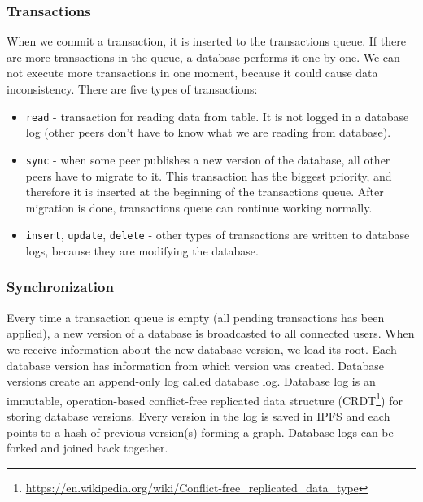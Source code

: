 \subsubsection{Transactions}
When we commit a transaction, it is inserted to the transactions queue. If there are more transactions in the queue, a database performs it one by one. We can not execute more transactions in one moment, because it could cause data inconsistency. There are five types of transactions:
\begin{itemize}
    \item \texttt{read} - transaction for reading data from table. It is not logged in a database log (other peers don't have to know what we are reading from database).
    \item \texttt{sync} - when some peer publishes a new version of the database, all other peers have to migrate to it. This transaction has the biggest priority, and therefore it is inserted at the beginning of the transactions queue. After migration is done, transactions queue can continue working normally.
    \item \texttt{insert}, \texttt{update}, \texttt{delete} - other types of transactions are written to database logs, because they are modifying the database.
\end{itemize}

\subsubsection{Synchronization} 
Every time a transaction queue is empty (all pending transactions has been applied), a new version of a database is broadcasted to all connected users. When we receive information about the new database version, we load its root. Each database version has information from which version was created. Database versions create an append-only log called database log. Database log is an immutable, operation-based conflict-free replicated data structure (CRDT\footnote{\url{https://en.wikipedia.org/wiki/Conflict-free_replicated_data_type}}) for storing database versions. Every version in the log is saved in IPFS and each points to a hash of previous version(s) forming a graph. Database logs can be forked and joined back together.\cite{crdtLog}

